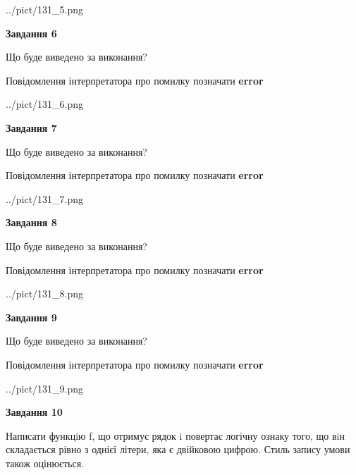 \documentclass[12pt, ukrainian]{article}
\begin{document}
{\begin {large}
\begin{center}
	{../pict/131_5.png}
\end{center}
\newpage

{\begin {center}\textbf{Завдання 6}\end {center}}\par
Що буде виведено за виконання? \par
Повідомлення інтерпретатора про помилку позначати \textbf{error}

\begin{center}
	{../pict/131_6.png}
\end{center}
\newpage

{\begin {center}\textbf{Завдання 7}\end {center}}\par
Що буде виведено за виконання? \par
Повідомлення інтерпретатора про помилку позначати \textbf{error}

\begin{center}
	{../pict/131_7.png}
\end{center}
\newpage

{\begin {center}\textbf{Завдання 8}\end {center}}\par
Що буде виведено за виконання? \par
Повідомлення інтерпретатора про помилку позначати \textbf{error}

\begin{center}
	{../pict/131_8.png}
\end{center}
\newpage

{\begin {center}\textbf{Завдання 9}\end {center}}\par
Що буде виведено за виконання? \par
Повідомлення інтерпретатора про помилку позначати \textbf{error}

\begin{center}
	{../pict/131_9.png}
\end{center}
\newpage

{\begin {center}\textbf{Завдання 10}\end {center}}\par

Написати функцiю f, що отримує рядок i повертає логічну ознаку того, що вiн складається рівно з однієї літери, яка є двійковою цифрою. Стиль запису умови також оцінюється.\par
\newpage

\end {large}}
\end{document}

